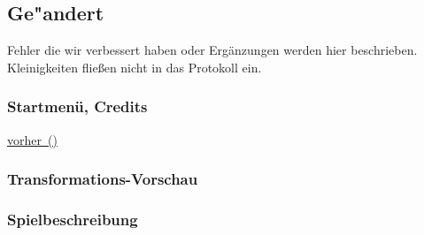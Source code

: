 %



\subsection{Ge{"a}ndert}
\label{Abschnitt:Aenderungen:Protokoll:Behobene_Probleme}

Fehler die wir verbessert haben oder Ergänzungen werden hier beschrieben. Kleinigkeiten fließen nicht in das Protokoll ein.\\





\subsubsection*{Startmenü, Credits}
\label{Abschnitt:Aenderungen:Protokoll:Startmenue}


\hyperref[Abb:Aenderungen:Startmenue_(vorher)]{vorher~(\mousecursor)}





\subsubsection*{Transformations-Vorschau}

\subsubsection*{Spielbeschreibung}










